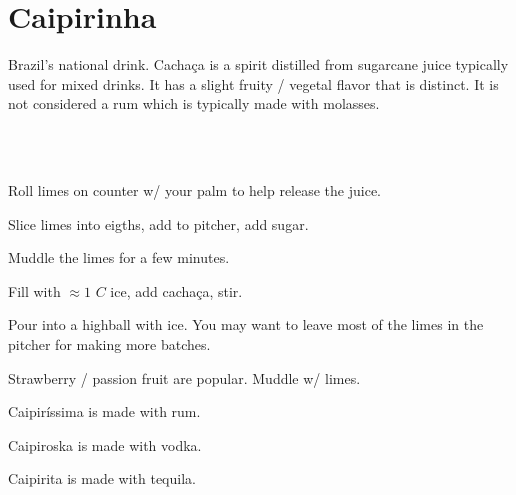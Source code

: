 \section[Caipirinha]{
    Caipirinha
}

\begin{recipestats}[
        servings=2,
        preptime=5 \minute,
        source=Marina \& Kevin,
    ]
\end{recipestats}

\begin{recipeabstract}
    Brazil's national drink.
    Cacha\c{c}a is a spirit distilled from sugarcane juice typically used for
    mixed drinks.
    It has a slight fruity / vegetal flavor that is distinct.
    It is not considered a rum which is typically made with molasses.
\end{recipeabstract}

\begin{ingredientcolumns}[1]
    \begin{ingredientblock}
        \\
        \\
    \end{ingredientblock}
\end{ingredientcolumns}

\begin{preparation}
\item Roll limes on counter w/ your palm to help release the juice.
\item Slice limes into eigths, add to pitcher, add sugar.
\item Muddle the limes for a few minutes.
\item Fill with $\approx 1$ $C$ ice, add cacha\c{c}a, stir.
\item Pour into a highball with ice.
    You may want to leave most of the limes in the pitcher for making more batches.
\end{preparation}

\begin{variation}
\item Strawberry / passion fruit are popular.
    Muddle w/ limes.
\item Caipir\'issima is made with rum.
\item Caipiroska is made with vodka.
\item Caipirita is made with tequila.
\end{variation}

\recipeend%
